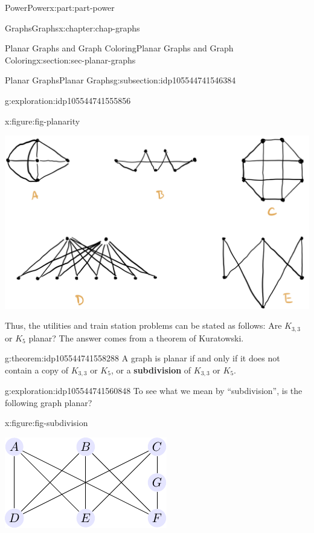 \documentclass[oneside,10pt,]{book}
\newcommand{\terminology}[1]{\textbf{#1}}
\numberwithin{equation}{section}
\begin{document}
\begin{partptx}{Power}{}{Power}{}{}{x:part:part-power}
\begin{chapterptx}{Graphs}{}{Graphs}{}{}{x:chapter:chap-graphs}
\begin{sectionptx}{Planar Graphs and Graph Coloring}{}{Planar Graphs and Graph Coloring}{}{}{x:section:sec-planar-graphs}
\begin{subsectionptx}{Planar Graphs}{}{Planar Graphs}{}{}{g:subsection:idp105544741546384}
\begin{exploration}{}{g:exploration:idp105544741555856}
\begin{figureptx}{}{x:figure:fig-planarity}{}%
\begin{image}{0.175}{0.65}{0.175}%
\includegraphics[width=\linewidth]{./images/planarity.png}
\end{image}%
\tcblower
\end{figureptx}%
\end{exploration}%
Thus, the utilities and train station problems can be stated as follows: Are \(K_{3,3}\) or \(K_5\) planar? The answer comes from a theorem of Kuratowski.%
\begin{theorem}{}{}{g:theorem:idp105544741558288}%
A graph is planar if and only if it does not contain a copy of \(K_{3,3}\) or \(K_5\), or a \terminology{subdivision} of \(K_{3,3}\) or  \(K_5\).\end{theorem}
\begin{exploration}{}{g:exploration:idp105544741560848}%
To see what we mean by ``subdivision'', is the following graph planar?%
\begin{figureptx}{}{x:figure:fig-subdivision}{}%
\begin{image}{0.325}{0.35}{0.325}%
\includegraphics[width=\linewidth]{./images/subdivision.pdf}

\end{image}
\end{figureptx}
\end{exploration}
\end{subsectionptx}
\end{sectionptx}
\end{chapterptx}
\end{partptx}
\end{document}
